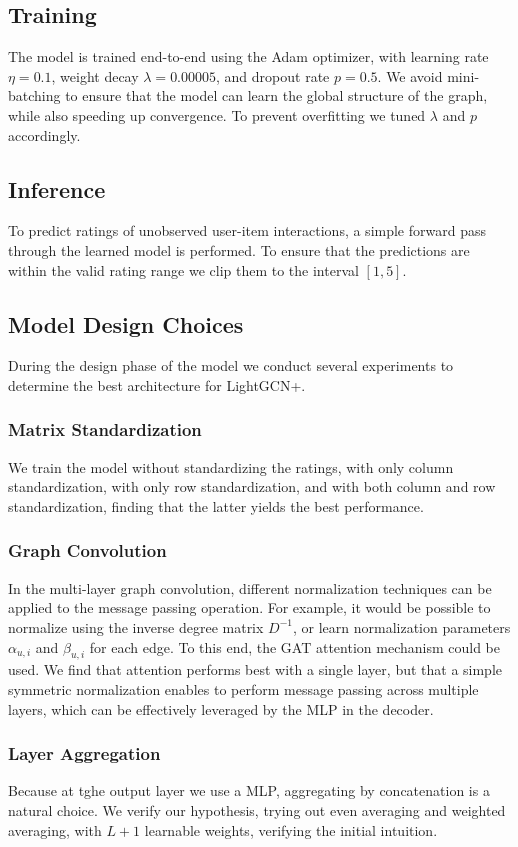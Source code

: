 \documentclass[10pt,conference,compsocconf]{IEEEtran}
\begin{document}
\subsection{Training}
The model is trained end-to-end using the Adam optimizer, with learning rate \(\eta=0.1\), weight decay $\lambda=0.00005$, and dropout rate \(p=0.5\).
We avoid mini-batching to ensure that the model can learn the global structure of the graph, while also speeding up convergence. 
To prevent overfitting we tuned $\lambda$ and $p$ accordingly. 

\subsection{Inference}
To predict ratings of unobserved user-item interactions, a simple forward pass through the learned model is performed.
To ensure that the predictions are within the valid rating range we clip them to the interval $[1, 5]$.

\subsection{Model Design Choices}
During the design phase of the model we conduct several experiments to determine the best architecture for LightGCN+.
\subsubsection{Matrix Standardization} We train the model without standardizing the ratings, with only column standardization, with only row standardization, and with both column and row standardization, finding that the latter yields the best performance.
\subsubsection{Graph Convolution}
In the multi-layer graph convolution, different normalization techniques can be applied to the message passing operation.
For example, it would be possible to normalize using the inverse degree matrix $D^{-1}$, or learn normalization parameters $\alpha_{u,i}$ and $\beta_{u,i}$ for each edge.
To this end, the GAT \cite{velivckovic2018graph} attention mechanism could be used. 
We find that attention performs best with a single layer, but that a simple symmetric normalization enables to perform message passing across multiple layers, which can be effectively leveraged by the MLP in the decoder.
\subsubsection{Layer Aggregation}
Because at tghe output layer we use a MLP, aggregating by concatenation is a natural choice.
We verify our hypothesis, trying out even averaging and weighted averaging, with $L+1$ learnable weights, verifying the initial intuition.
\end{document}
